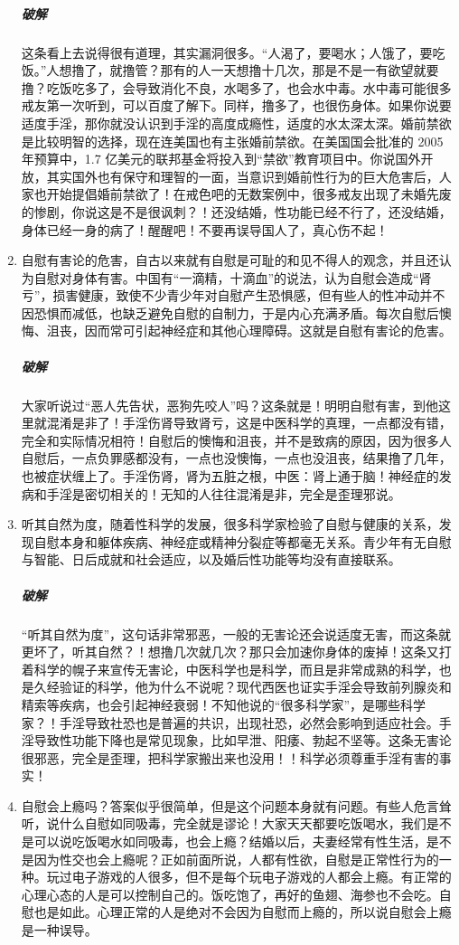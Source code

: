 \begin{enumerate}
    \subparagraph{破解} 这条看上去说得很有道理，其实漏洞很多。“人渴了，要喝水；人饿了，要吃饭。”人想撸了，就撸管？那有的人一天想撸十几次，那是不是一有欲望就要撸？吃饭吃多了，会导致消化不良，水喝多了，也会水中毒。水中毒可能很多戒友第一次听到，可以百度了解下。同样，撸多了，也很伤身体。如果你说要适度手淫，那你就没认识到手淫的高度成瘾性，适度的水太深太深。婚前禁欲是比较明智的选择，现在连美国也有主张婚前禁欲。在美国国会批准的 2005 年预算中，1.7 亿美元的联邦基金将投入到“禁欲”教育项目中。你说国外开放，其实国外也有保守和理智的一面，当意识到婚前性行为的巨大危害后，人家也开始提倡婚前禁欲了！在戒色吧的无数案例中，很多戒友出现了未婚先废的惨剧，你说这是不是很讽刺？！还没结婚，性功能已经不行了，还没结婚，身体已经一身的病了！醒醒吧！不要再误导国人了，真心伤不起！
    \item 自慰有害论的危害，自古以来就有自慰是可耻的和见不得人的观念，并且还认为自慰对身体有害。中国有“一滴精，十滴血”的说法，认为自慰会造成“肾亏”，损害健康，致使不少青少年对自慰产生恐惧感，但有些人的性冲动并不因恐惧而减低，也缺乏避免自慰的自制力，于是内心充满矛盾。每次自慰后懊悔、沮丧，因而常可引起神经症和其他心理障碍。这就是自慰有害论的危害。
    \subparagraph{破解} 大家听说过“恶人先告状，恶狗先咬人”吗？这条就是！明明自慰有害，到他这里就混淆是非了！手淫伤肾导致肾亏，这是中医科学的真理，一点都没有错，完全和实际情况相符！自慰后的懊悔和沮丧，并不是致病的原因，因为很多人自慰后，一点负罪感都没有，一点也没懊悔，一点也没沮丧，结果撸了几年，也被症状缠上了。手淫伤肾，肾为五脏之根，中医：肾上通于脑！神经症的发病和手淫是密切相关的！无知的人往往混淆是非，完全是歪理邪说。
    \item 听其自然为度，随着性科学的发展，很多科学家检验了自慰与健康的关系，发现自慰本身和躯体疾病、神经症或精神分裂症等都毫无关系。青少年有无自慰与智能、日后成就和社会适应，以及婚后性功能等均没有直接联系。
    \subparagraph{破解} “听其自然为度”，这句话非常邪恶，一般的无害论还会说适度无害，而这条就更坏了，听其自然？！想撸几次就几次？那只会加速你身体的废掉！这条又打着科学的幌子来宣传无害论，中医科学也是科学，而且是非常成熟的科学，也是久经验证的科学，他为什么不说呢？现代西医也证实手淫会导致前列腺炎和精索等疾病，也会引起神经衰弱！不知他说的“很多科学家”，是哪些科学家？！手淫导致社恐也是普遍的共识，出现社恐，必然会影响到适应社会。手淫导致性功能下降也是常见现象，比如早泄、阳痿、勃起不坚等。这条无害论很邪恶，完全是歪理，把科学家搬出来也没用！！科学必须尊重手淫有害的事实！
    \item 自慰会上瘾吗？答案似乎很简单，但是这个问题本身就有问题。有些人危言耸听，说什么自慰如同吸毒，完全就是谬论！大家天天都要吃饭喝水，我们是不是可以说吃饭喝水如同吸毒，也会上瘾？结婚以后，夫妻经常有性生活，是不是因为性交也会上瘾呢？正如前面所说，人都有性欲，自慰是正常性行为的一种。玩过电子游戏的人很多，但不是每个玩电子游戏的人都会上瘾。有正常的心理心态的人是可以控制自己的。饭吃饱了，再好的鱼翅、海参也不会吃。自慰也是如此。心理正常的人是绝对不会因为自慰而上瘾的，所以说自慰会上瘾是一种误导。

\end{enumerate}
